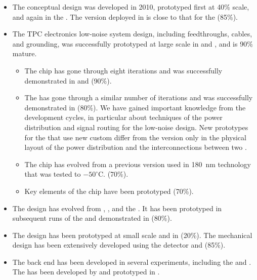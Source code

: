 \begin{itemize}
\item The  conceptual design was developed in 2010, prototyped
first at 40\% scale, and again in the . The version deployed in
 is close to that for the  (85\%). 

\item The TPC electronics 
 low-noise system design, including feedthroughs, cables, and
grounding, was successfully prototyped at large scale in
 and , and is 90\% mature. 
%
\begin{itemize}  %
\item The  chip has gone through eight iterations and was successfully
demonstrated in  and  (90\%). 

\item The  has gone through a similar number of iterations and was
successfully demonstrated in  (80\%). We have gained important
knowledge from the 
development cycles, in particular about techniques of the power distribution and
signal routing for the low-noise design. New  prototypes for the  that use new custom  differ from the  version only in the physical layout of the power distribution and the interconnections between 
two . 

\item The  chip
has evolved from a previous version used in  180~nm
technology that was tested to $-50^\circ$C. (70\%). 

\item Key elements of
the  chip have been prototyped (70\%). 
\end{itemize}  %
%
\item The 
design has evolved from , , and the
.  It has been prototyped in subsequent runs of the
 and demonstrated in  (80\%). 

\item The 
 design has been prototyped at small scale and in
 (20\%). The mechanical design has been extensively
developed using the  detector and  (85\%). 

\item The
  back end has been developed in several
experiments, including the  and . The
   has been developed by
 and prototyped in .
\end{itemize}

